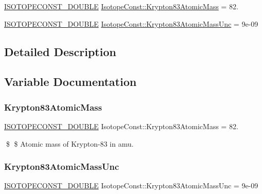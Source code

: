 \begin{DoxyCompactItemize}
\item 
\mbox{\hyperlink{group___isotope_const-_macros_ga8f45a7272ce02c0b4c65c44636ed719a}{I\+S\+O\+T\+O\+P\+E\+C\+O\+N\+S\+T\+\_\+\+D\+O\+U\+B\+LE}} \mbox{\hyperlink{group___isotope_const-_krypton-_kr83_ga9081044da3bf96c69029c74afc0af225}{Isotope\+Const\+::\+Krypton83\+Atomic\+Mass}} = 82.
\item 
\mbox{\hyperlink{group___isotope_const-_macros_ga8f45a7272ce02c0b4c65c44636ed719a}{I\+S\+O\+T\+O\+P\+E\+C\+O\+N\+S\+T\+\_\+\+D\+O\+U\+B\+LE}} \mbox{\hyperlink{group___isotope_const-_krypton-_kr83_gaba837addecf1587032bad00fcc02defd}{Isotope\+Const\+::\+Krypton83\+Atomic\+Mass\+Unc}} = 9e-\/09
\end{DoxyCompactItemize}


\subsection{Detailed Description}


\subsection{Variable Documentation}
\mbox{\label{group___isotope_const-_krypton-_kr83_ga9081044da3bf96c69029c74afc0af225}} 
\subsubsection{\texorpdfstring{Krypton83\+Atomic\+Mass}{Krypton83AtomicMass}}
{\footnotesize\ttfamily \mbox{\hyperlink{group___isotope_const-_macros_ga8f45a7272ce02c0b4c65c44636ed719a}{I\+S\+O\+T\+O\+P\+E\+C\+O\+N\+S\+T\+\_\+\+D\+O\+U\+B\+LE}} Isotope\+Const\+::\+Krypton83\+Atomic\+Mass = 82.}

\$ \$ Atomic mass of Krypton-\/83 in amu. \mbox{\label{group___isotope_const-_krypton-_kr83_gaba837addecf1587032bad00fcc02defd}} 
\subsubsection{\texorpdfstring{Krypton83\+Atomic\+Mass\+Unc}{Krypton83AtomicMassUnc}}
{\footnotesize\ttfamily \mbox{\hyperlink{group___isotope_const-_macros_ga8f45a7272ce02c0b4c65c44636ed719a}{I\+S\+O\+T\+O\+P\+E\+C\+O\+N\+S\+T\+\_\+\+D\+O\+U\+B\+LE}} Isotope\+Const\+::\+Krypton83\+Atomic\+Mass\+Unc = 9e-\/09}

